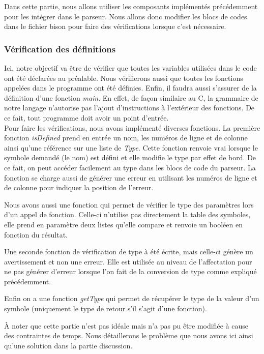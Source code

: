 \documentclass[a4paper]{article}%
\begin{document}
Dans cette partie, nous allons utiliser les composants implémentés précédemment
pour les intégrer dans le parseur. Nous allons donc modifier les blocs de
codes dans le fichier bison pour faire des vérifications lorsque c'est
nécessaire.

\subsubsection*{Vérification des définitions}\label{sec:verifDef}

Ici, notre objectif va être de vérifier que toutes les variables utilisées dans
le code ont été déclarées au préalable. Nous vérifierons aussi que toutes les
fonctions appelées dans le programme ont été définies. Enfin, il faudra aussi
s'assurer de la définition d'une fonction \textit{main}. En effet, de façon
similaire au C, la grammaire de notre langage n'autorise pas l'ajout
d'instructions à l'extérieur des fonctions. De ce fait, tout programme doit
avoir un point d'entrée.\\

Pour faire les vérifications, nous avons implémenté diverses fonctions. La
première fonction \textit{isDefined} prend en entrée un nom, les numéros de
ligne et de colonne ainsi qu'une référence sur une liste de \textit{Type}.
Cette fonction renvoie vrai lorsque le symbole demandé (le nom) est défini et
elle modifie le type par effet de bord. De ce fait, on peut accéder facilement
au type dans les blocs de code du parseur. La fonction se charge aussi
de générer une erreur en utilisant les numéros de ligne et de colonne pour
indiquer la position de l'erreur.

Nous avons aussi une fonction qui permet de vérifier le type des paramètres lors
d'un appel de fonction. Celle-ci n'utilise pas directement la table des
symboles, elle prend en paramètre deux listes qu'elle compare et renvoie un
booléen en fonction du résultat.

Une seconde fonction de vérification de type à été écrite, mais celle-ci génère
un avertissement et non une erreur. Elle est utilisée au niveau de l'affectation
pour ne pas générer d'erreur lorsque l'on fait de la conversion de type comme
expliqué précédemment.

Enfin on a une fonction \textit{getType} qui permet de récupérer le type de la
valeur d'un symbole (uniquement le type de retour s'il s'agit d'une fonction).

À noter que cette partie n'est pas idéale mais n'a pas pu être modifiée à cause
des contraintes de temps. Nous détaillerons le problème que nous avons ici ainsi
qu'une solution dans la partie discussion.\\
\end{document}
